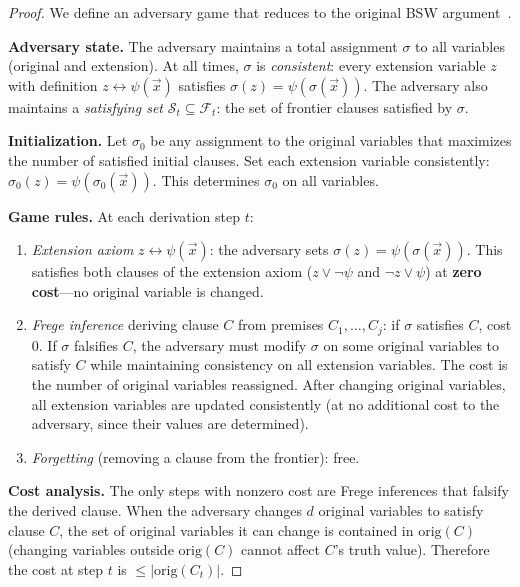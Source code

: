 \documentclass[11pt]{article}
\theoremstyle{definition}
\newcommand{\frontier}{\mathcal{F}}
\begin{document}
\begin{proof}
We define an adversary game that reduces to the original BSW
argument~\cite{BenSasson2001}.

\textbf{Adversary state.}  The adversary maintains a total assignment
$\sigma$ to all variables (original and extension).  At all times,
$\sigma$ is \emph{consistent}: every extension variable $z$ with
definition $z \leftrightarrow \psi(\vec{x})$ satisfies
$\sigma(z) = \psi(\sigma(\vec{x}))$.  The adversary also maintains
a \emph{satisfying set} $\mathcal{S}_t \subseteq \frontier_t$: the
set of frontier clauses satisfied by $\sigma$.

\textbf{Initialization.}  Let $\sigma_0$ be any assignment to the
original variables that maximizes the number of satisfied initial
clauses.  Set each extension variable consistently:
$\sigma_0(z) = \psi(\sigma_0(\vec{x}))$.  This determines $\sigma_0$
on all variables.

\textbf{Game rules.}  At each derivation step $t$:
\begin{enumerate}[label=(\roman*)]
\item \emph{Extension axiom} $z \leftrightarrow \psi(\vec{x})$:
the adversary sets $\sigma(z) = \psi(\sigma(\vec{x}))$.  This
satisfies both clauses of the extension axiom
($z \vee \neg\psi$ and $\neg z \vee \psi$) at \textbf{zero cost}---no
original variable is changed.

\item \emph{Frege inference} deriving clause $C$ from premises
$C_1, \ldots, C_j$: if $\sigma$ satisfies $C$, cost $0$.  If $\sigma$
falsifies $C$, the adversary must modify $\sigma$ on some original
variables to satisfy $C$ while maintaining consistency on all extension
variables.  The cost is the number of original variables reassigned.
After changing original variables, all extension variables are updated
consistently (at no additional cost to the adversary, since their
values are determined).

\item \emph{Forgetting} (removing a clause from the frontier): free.
\end{enumerate}

\textbf{Cost analysis.}  The only steps with nonzero cost are Frege
inferences that falsify the derived clause.  When the adversary changes
$d$ original variables to satisfy clause $C$, the set of original
variables it can change is contained in $\mathrm{orig}(C)$ (changing
variables outside $\mathrm{orig}(C)$ cannot affect $C$'s truth value).
Therefore the cost at step $t$ is $\leq |\mathrm{orig}(C_t)|$.


\end{proof}
\end{document}
